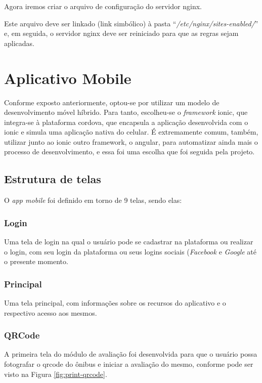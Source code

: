Agora iremos criar o arquivo de configuração do servidor \gls{nginx}.


Este arquivo deve ser linkado (link simbólico) à pasta ``\textit{/etc/nginx/sites-enabled/}'' e, em seguida, o servidor \gls{nginx} deve ser reiniciado para que as regras sejam aplicadas.

\section{Aplicativo Mobile}\label{sec:spec-appmobile}
Conforme exposto anteriormente, optou-se por utilizar um modelo de desenvolvimento móvel híbrido. Para tanto, escolheu-se o \textit{framework} \gls{ionic}, que integra-se à plataforma \gls{cordova}, que encapsula a aplicação desenvolvida com o \gls{ionic} e simula uma aplicação nativa do celular. É extremamente comum, também, utilizar junto ao \gls{ionic} outro framework, o \gls{angular}, para automatizar ainda mais o processo de desenvolvimento, e essa foi uma escolha que foi seguida pela projeto.

\subsection{Estrutura de telas}
O \textit{app mobile} foi definido em torno de 9 telas, sendo elas:

\subsubsection{Login}
Uma tela de login na qual o usuário pode se cadastrar na plataforma ou realizar o login, com seu login da plataforma ou seus logins sociais (\textit{Facebook} e \textit{Google} até o presente momento.
    
\subsubsection{Principal}
Uma tela principal, com informações sobre os recursos do aplicativo e o respectivo acesso aos mesmos.
    
\subsubsection{QRCode}
A primeira tela do módulo de avaliação foi desenvolvida para que o usuário possa fotografar o \gls{qrcode} do ônibus e iniciar a avaliação do mesmo, conforme pode ser visto na Figura \ref{fig:print-qrcode}.
    
